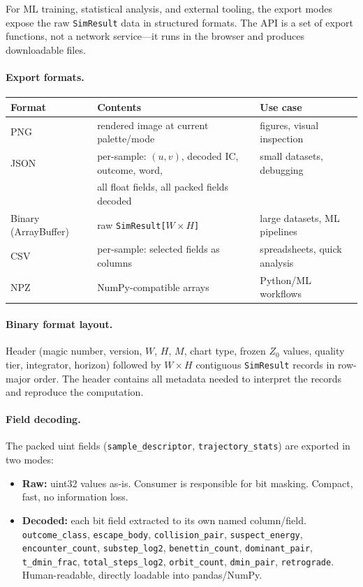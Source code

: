 \documentclass[11pt]{report}
\begin{document}
For ML training, statistical analysis, and external tooling, the export modes expose the raw \texttt{SimResult} data in structured formats. The API is a set of export functions, not a network service---it runs in the browser and produces downloadable files.

\paragraph{Export formats.}

\begin{center}
\begin{tabular}{lll}
\toprule
Format & Contents & Use case \\
\midrule
PNG & rendered image at current palette/mode & figures, visual inspection \\
JSON & per-sample: $(u,v)$, decoded IC, outcome, word, & small datasets, debugging \\
 & all float fields, all packed fields decoded & \\
Binary (ArrayBuffer) & raw \texttt{SimResult[$W \times H$]} & large datasets, ML pipelines \\
CSV & per-sample: selected fields as columns & spreadsheets, quick analysis \\
NPZ & NumPy-compatible arrays & Python/ML workflows \\
\bottomrule
\end{tabular}
\end{center}

\paragraph{Binary format layout.} Header (magic number, version, $W$, $H$, $M$, chart type, frozen $Z_0$ values, quality tier, integrator, horizon) followed by $W\times H$ contiguous \texttt{SimResult} records in row-major order. The header contains all metadata needed to interpret the records and reproduce the computation.

\paragraph{Field decoding.} The packed uint fields (\texttt{sample\_descriptor}, \texttt{trajectory\_stats}) are exported in two modes:
\begin{itemize}[nosep]
\item \textbf{Raw:} uint32 values as-is. Consumer is responsible for bit masking. Compact, fast, no information loss.
\item \textbf{Decoded:} each bit field extracted to its own named column/field. \texttt{outcome\_class}, \texttt{escape\_body}, \texttt{collision\_pair}, \texttt{suspect\_energy}, \texttt{encounter\_count}, \texttt{substep\_log2}, \texttt{benettin\_count}, \texttt{dominant\_pair}, \texttt{t\_dmin\_frac}, \texttt{total\_steps\_log2}, \texttt{orbit\_count}, \texttt{dmin\_pair}, \texttt{retrograde}. Human-readable, directly loadable into pandas/NumPy.
\end{itemize}
\end{document}
